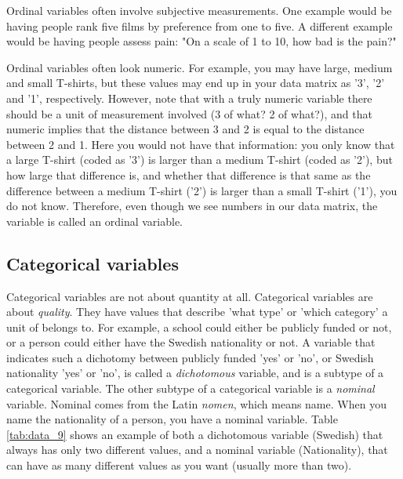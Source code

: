 Ordinal variables often involve subjective measurements. One example would be having people rank five films by preference from one to five. A different example would be having people assess pain: "On a scale of 1 to 10, how bad is the pain?"

Ordinal variables often look numeric. For example, you may have large, medium and small T-shirts, but these values may end up in your data matrix as '3', '2' and '1', respectively. However, note that with a truly numeric variable there should be a unit of measurement involved (3 of what? 2 of what?), and that numeric implies that the distance between 3 and 2 is equal to the distance between 2 and 1. Here you would not have that information: you only know that a large T-shirt (coded as '3') is larger than a medium T-shirt (coded as '2'), but how large that difference is, and whether that difference is that same as the difference between a medium T-shirt ('2') is larger than a small T-shirt ('1'), you do not know. Therefore, even though we see numbers in our data matrix, the variable is called an ordinal variable. 


\subsection{Categorical variables}

Categorical variables are not about quantity at all. Categorical variables are about \textit{quality}. They have values that describe 'what type' or 'which category' a unit of belongs to. For example, a school could either be publicly funded or not, or a person could either have the Swedish nationality or not. A variable that indicates such a dichotomy between publicly funded 'yes' or 'no', or Swedish nationality 'yes' or 'no', is called a \textit{dichotomous} variable, and is a subtype of a categorical variable. The other subtype of a categorical variable is a \textit{nominal} variable. Nominal comes from the Latin \textit{nomen}, which means name. When you name the nationality of a person, you have a nominal variable. Table \ref{tab:data_9} shows an example of both a dichotomous variable (Swedish) that always has only two different values, and a nominal variable (Nationality), that can have as many different values as you want (usually more than two).



\begin{kframe}


{\ttfamily\noindent\bfseries{}}\end{kframe}

